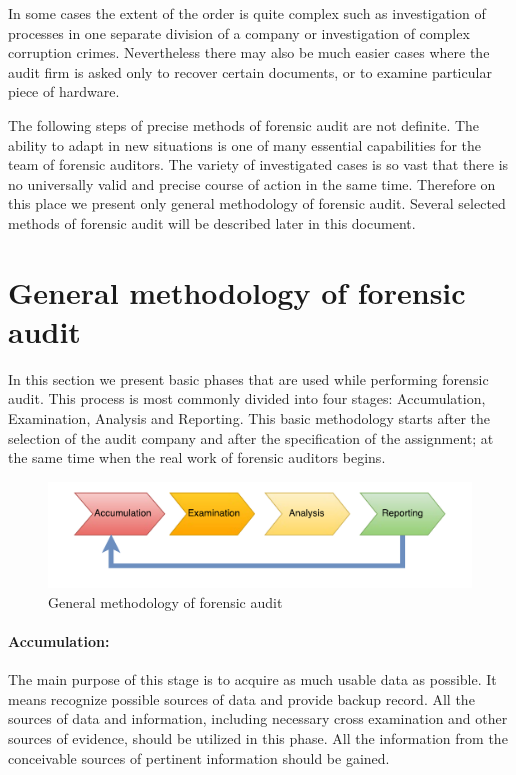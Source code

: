 In some cases the extent of the order is quite complex such as investigation of processes in one separate division of a company or investigation of complex corruption crimes. Nevertheless there may also be much easier cases where the audit firm is asked only to recover certain documents, or to examine particular piece of hardware. 

The following steps of precise methods of forensic audit are not definite. The ability to adapt in new situations is one of many essential capabilities for the team of forensic auditors. The variety of investigated cases is so vast that there is no universally valid and precise course of action in the same time. Therefore on this place we present only general methodology of forensic audit. Several selected methods of forensic audit will be described later in this document. 

\section{General methodology of forensic audit}
In this section we present basic phases that are used while performing forensic audit. This process is most commonly divided into four stages: Accumulation, Examination, Analysis and Reporting. This basic methodology starts after the  selection of the audit company and after the specification of the assignment; at the same time when the real work of forensic auditors begins.

\begin{figure}[h]
	\begin{center} 
	\includegraphics[width=1.0\textwidth]{img/general_methodology.pdf}
	\end{center}
	\caption{General methodology of forensic audit}
\end{figure}

\paragraph{Accumulation:} 
The main purpose of this stage is to acquire as much usable data as possible. It means recognize possible sources of data and provide backup record. All the sources of data and information, including necessary cross examination and other sources of evidence, should be utilized in this phase. All the information from the conceivable sources of pertinent information should be gained.

